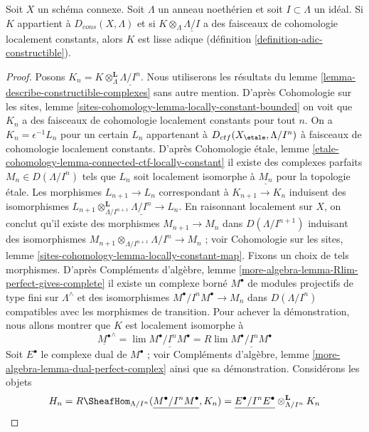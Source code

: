 \begin{lemma}
\label{lemma-connected-adic-lisse}
Soit $X$ un schéma connexe. Soit $\Lambda$ un anneau noethérien et soit
$I \subset \Lambda$ un idéal. Si $K$ appartient à $D_{cons}(X, \Lambda)$
et si $K \otimes_\Lambda \underline{\Lambda/I}$
a des faisceaux de cohomologie localement constants, alors $K$ est lisse adique
(définition \ref{definition-adic-constructible}).
\end{lemma}

\begin{proof}
Posons $K_n = K \otimes_\Lambda^\mathbf{L} \underline{\Lambda/I^n}$.
Nous utiliserons les résultats du lemme \ref{lemma-describe-constructible-complexes}
sans autre mention. D'après Cohomologie sur les sites, lemme
\ref{sites-cohomology-lemma-locally-constant-bounded}
on voit que $K_n$ a des faisceaux de cohomologie localement constants pour tout $n$.
On a $K_n = \epsilon^{-1}L_n$ pour un certain $L_n$ appartenant à
$D_{ctf}(X_\etale, \Lambda/I^n)$ à faisceaux de cohomologie localement constants.
D'après Cohomologie étale, lemme
\ref{etale-cohomology-lemma-connected-ctf-locally-constant}
il existe des complexes parfaits $M_n \in D(\Lambda/I^n)$
tels que $L_n$ soit localement isomorphe à $\underline{M_n}$ pour la topologie \'etale.
Les morphismes $L_{n + 1} \to L_n$ correspondant à $K_{n + 1} \to K_n$
induisent des isomorphismes
$L_{n + 1} \otimes_{\Lambda/I^{n + 1}}^\mathbf{L} \underline{\Lambda/I^n}
\to L_n$. En raisonnant localement sur $X$, on conclut qu'il
existe des morphismes $M_{n + 1} \to M_n$ dans $D(\Lambda/I^{n + 1})$
induisant des isomorphismes
$M_{n + 1} \otimes_{\Lambda/I^{n + 1}} \Lambda/I^n \to M_n$ ; voir
Cohomologie sur les sites, lemme \ref{sites-cohomology-lemma-locally-constant-map}.
Fixons un choix de tels morphismes. D'après
Compléments d'algèbre, lemme \ref{more-algebra-lemma-Rlim-perfect-gives-complete}
il existe un complexe borné $M^\bullet$ de modules projectifs de type fini sur
$\Lambda^\wedge$ et des isomorphismes $M^\bullet/I^nM^\bullet \to M_n$
dans $D(\Lambda/I^n)$ compatibles avec les morphismes de transition.
Pour achever la démonstration, nous allons montrer que $K$ est localement isomorphe
à
$$
\underline{M^\bullet}^\wedge =
\lim \underline{M^\bullet/I^nM^\bullet} =
R\lim \underline{M^\bullet/I^nM^\bullet}
$$
Soit $E^\bullet$ le complexe dual de $M^\bullet$ ; voir
Compléments d'algèbre, lemme \ref{more-algebra-lemma-dual-perfect-complex}
ainsi que sa démonstration. Considérons les objets
$$
H_n =
R\SheafHom_{\Lambda/I^n}(\underline{M^\bullet/I^nM^\bullet}, K_n) =
\underline{E^\bullet/I^nE^\bullet} \otimes_{\Lambda/I^n}^\mathbf{L} K_n
$$
\end{proof}
